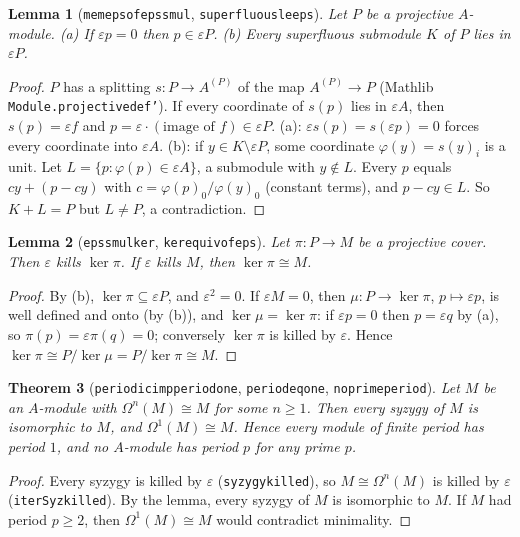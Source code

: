 \documentclass[11pt]{article}
\renewcommand{\_}{\oldus\allowbreak}
\newtheorem{theorem}{Theorem}
\newtheorem{lemma}[theorem]{Lemma}
\theoremstyle{definition}
\theoremstyle{remark}
\begin{document}
\begin{lemma}[\texttt{mem\_eps\_of\_eps\_smul}, \texttt{superfluous\_le\_eps}]
Let $P$ be a projective $A$-module. (a) If $\varepsilon p=0$ then $p\in\varepsilon P$. (b) Every
superfluous submodule $K$ of $P$ lies in $\varepsilon P$.
\end{lemma}
\begin{proof}
$P$ has a splitting $s:P\to A^{(P)}$ of the map $A^{(P)}\to P$ (Mathlib
\texttt{Module.projective\_def'}). If every coordinate of $s(p)$ lies in $\varepsilon A$, then
$s(p)=\varepsilon f$ and $p=\varepsilon\cdot(\text{image of }f)\in\varepsilon P$. (a): $\varepsilon s(p)=s(\varepsilon p)=0$
forces every coordinate into $\varepsilon A$. (b): if $y\in K\setminus\varepsilon P$, some coordinate
$\varphi(y)=s(y)_i$ is a unit. Let $L=\{p:\varphi(p)\in\varepsilon A\}$, a submodule with $y\notin L$.
Every $p$ equals $c y+(p-cy)$ with $c=\varphi(p)_0/\varphi(y)_0$ (constant terms), and $p-cy\in L$.
So $K+L=P$ but $L\ne P$, a contradiction.
\end{proof}

\begin{lemma}[\texttt{eps\_smul\_ker}, \texttt{ker\_equiv\_of\_eps}]
Let $\pi:P\to M$ be a projective cover. Then $\varepsilon$ kills $\ker\pi$. If $\varepsilon$ kills $M$, then
$\ker\pi\cong M$.
\end{lemma}
\begin{proof}
By (b), $\ker\pi\subseteq\varepsilon P$, and $\varepsilon^2=0$. If $\varepsilon M=0$, then $\mu:P\to\ker\pi$,
$p\mapsto\varepsilon p$, is well defined and onto (by (b)), and $\ker\mu=\ker\pi$: if $\varepsilon p=0$ then
$p=\varepsilon q$ by (a), so $\pi(p)=\varepsilon\pi(q)=0$; conversely $\ker\pi$ is killed by $\varepsilon$.
Hence $\ker\pi\cong P/\ker\mu=P/\ker\pi\cong M$.
\end{proof}

\begin{theorem}[\texttt{periodic\_imp\_period\_one}, \texttt{period\_eq\_one}, \texttt{no\_prime\_period}]\label{thm:main}
Let $M$ be an $A$-module with $\Omega^n(M)\cong M$ for some $n\ge1$. Then every syzygy of $M$ is
isomorphic to $M$, and $\Omega^1(M)\cong M$. Hence every module of finite period has period $1$, and
no $A$-module has period $p$ for any prime $p$.
\end{theorem}
\begin{proof}
Every syzygy is killed by $\varepsilon$ (\texttt{syzygy\_killed}), so $M\cong\Omega^n(M)$ is killed by
$\varepsilon$ (\texttt{iterSyz\_killed}). By the lemma, every syzygy of $M$ is isomorphic to $M$. If $M$
had period $p\ge2$, then $\Omega^1(M)\cong M$ would contradict minimality.
\end{proof}
\end{document}
